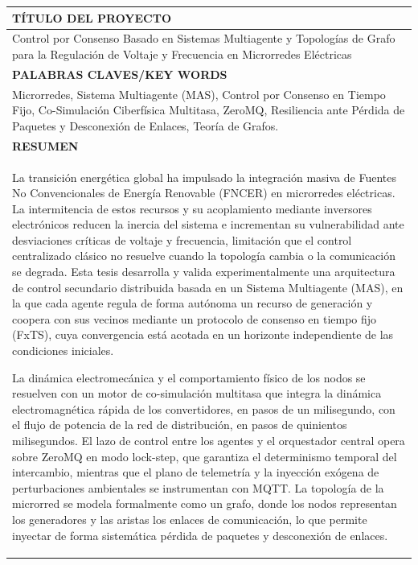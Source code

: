 \begin{longtable}{|p{\dimexpr\textwidth-2\tabcolsep-2\arrayrulewidth}|}
\hline
\rowcolor{lightgray}\centering\arraybackslash\textbf{TÍTULO DEL PROYECTO} \\\hline
Control por Consenso Basado en Sistemas Multiagente y Topologías de Grafo para la Regulación de Voltaje y Frecuencia en Microrredes Eléctricas \\\hline
\rowcolor{lightgray}\centering\arraybackslash\textbf{PALABRAS CLAVES/KEY WORDS} \\\hline
Microrredes, Sistema Multiagente (MAS), Control por Consenso en Tiempo Fijo, Co-Simulación Ciberfísica Multitasa, ZeroMQ, Resiliencia ante Pérdida de Paquetes y Desconexión de Enlaces, Teoría de Grafos. \\\hline
\rowcolor{lightgray}\centering\arraybackslash\textbf{RESUMEN} \\\hline
La transición energética global ha impulsado la integración masiva de Fuentes No Convencionales de Energía Renovable (FNCER) en microrredes eléctricas. La intermitencia de estos recursos y su acoplamiento mediante inversores electrónicos reducen la inercia del sistema e incrementan su vulnerabilidad ante desviaciones críticas de voltaje y frecuencia, limitación que el control centralizado clásico no resuelve cuando la topología cambia o la comunicación se degrada. Esta tesis desarrolla y valida experimentalmente una arquitectura de control secundario distribuida basada en un Sistema Multiagente (MAS), en la que cada agente regula de forma autónoma un recurso de generación y coopera con sus vecinos mediante un protocolo de consenso en tiempo fijo (FxTS), cuya convergencia está acotada en un horizonte independiente de las condiciones iniciales.

La dinámica electromecánica y el comportamiento físico de los nodos se resuelven con un motor de co-simulación multitasa que integra la dinámica electromagnética rápida de los convertidores, en pasos de un milisegundo, con el flujo de potencia de la red de distribución, en pasos de quinientos milisegundos. El lazo de control entre los agentes y el orquestador central opera sobre ZeroMQ en modo lock-step, que garantiza el determinismo temporal del intercambio, mientras que el plano de telemetría y la inyección exógena de perturbaciones ambientales se instrumentan con MQTT. La topología de la microrred se modela formalmente como un grafo, donde los nodos representan los generadores y las aristas los enlaces de comunicación, lo que permite inyectar de forma sistemática pérdida de paquetes y desconexión de enlaces.


\end{longtable}
